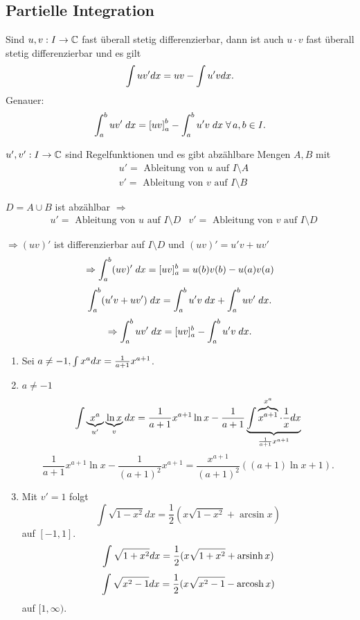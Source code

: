 \documentclass[../ana2.tex]{subfiles}
\begin{document}
\subsection*{Partielle Integration}
\begin{satz}
    Sind \(\abb{u,v}{I}{\C}\) fast überall stetig 
    differenzierbar, dann ist auch 
    \( u \cdot v \) fast überall stetig differenzierbar und 
    es gilt 
    \[ \int u v' \dx{x} = uv - \int u' v \dx{x}. \]
    Genauer: 
    \[ \integral{uv'}{a}{b} 
    = \left[ uv \right]_a^b - \integral{u'v}{a}{b} 
    \;\forall a,b\in I. \]
\end{satz}
\begin{bew}
\( \abb{u',v'}{I}{\C} \) sind Regelfunktionen und es gibt 
abzählbare Mengen \(A,B\) mit 
\begin{align*}
    & u' = \text{ Ableitung von } u \text{ auf } I \setminus A \\
    & v' = \text{ Ableitung von } v \text{ auf } I \setminus B 
\end{align*}

\(D = A \cup B \) ist abzählbar
\(\Rightarrow\)
\begin{align*}
    &u' = \text{ Ableitung von } u \text{ auf } I \setminus D
    &v' = \text{ Ableitung von } v \text{ auf } I \setminus D
\end{align*}

\( \Rightarrow (uv)' \) ist differenzierbar auf 
\( I \setminus D \) und \( (uv)' = u'v + uv' \)
\[ \Rightarrow \integral{(uv)'}{a}{b} 
= [uv]_a^b = u(b)v(b) - u(a)v(a) \]
\[ \integral{(u'v + uv')}{a}{b} 
= \integral{u'v}{a}{b} + \integral{uv'}{a}{b}. \]
\[ \Rightarrow \integral{uv'}{a}{b} 
= [uv]_a^b - \integral{u'v}{a}{b}. \]
\end{bew}
\begin{bspe}
    \begin{enumerate}
        \item Sei \( a \neq -1, 
        \int x^a \dx{x} = \frac{1}{a+1}x^{a+1} \).
        \item \(a \neq -1\)
        \[ \int \underbrace{x^a}_{u'} \underbrace{\ln x}_{v} \dx{x} 
        = \frac{1}{a+1}x^{a+1} \ln x 
        - \frac{1}{a+1} 
        \underbrace{\int \overbrace{x^{a+1}}^{x^a} \cdot \frac{1}{x} dx}_
    {\frac{1}{a+1}x^{a+1}} \]
        \[ \frac{1}{a+1} x^{a+1} \ln x 
        - \frac{1}{(a+1)^2} x^{a+1} 
        = \frac{x^{a+1}}{(a+1)^2} 
        ((a+1) \ln x + 1). \]
        \item Mit \( v' = 1 \) folgt 
        \[ \int \sqrt{1-x^2} dx 
        = \frac{1}{2} (x \sqrt{1 - x^2} + \arcsin x) \]
        auf \( [-1,1] \).\\
        \[ \int \sqrt{1 + x^2} dx 
        = \frac{1}{2} (x \sqrt{1 + x^2} + \arsinh x) \]
        \[ \int \sqrt{x^2 - 1} dx 
        = \frac{1}{2} (x \sqrt{x^2 - 1} - \arcosh x) \]
        auf \( [1,\infty) \).
    \end{enumerate}
\end{bspe}
\end{document}
